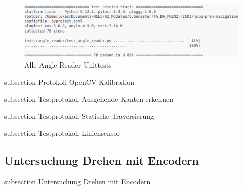 \begin{figure}[H]
\centering
\includegraphics[width=\textwidth]{assets/IT/testing/unittests/angle_reader_unittests_result.png}
\caption{Alle Angle Reader Unittests}
\label{fig:angle-reader-unittests}
\end{figure}



{subsection}
{Protokoll OpenCV Kalibration}





{subsection}
{Testprotokoll Ausgehende Kanten erkennen}





{subsection}
{Testprotokoll Statische Traversierung}




{subsection}
{Testprotokoll Liniensensor}






\newpage
\subsection*{Untersuchung Drehen mit Encodern}\label{drehen-encoder}
    {subsection}
    {Untersuchung Drehen mit Encodern}

